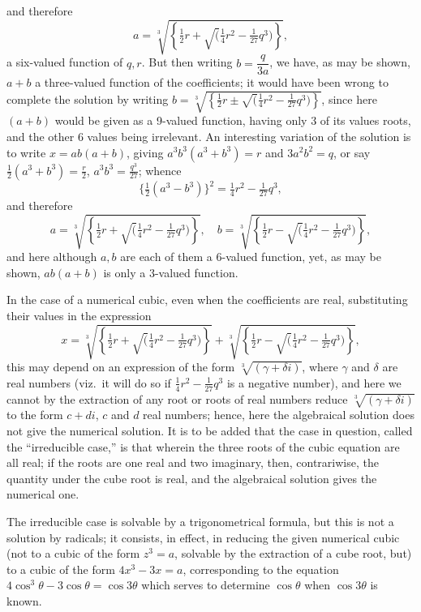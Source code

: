 \documentclass[12pt,a4paper]{article}
\begin{document}
\noindent and therefore
\[
a = \sqrt[3]{\left\{\tfrac{1}{2}r + \surd(\tfrac{1}{4}r^2 - \tfrac{1}{27}q^3)\right\}},
\]
a six-valued function of $q, r$. But then writing $b = \dfrac{q}{3a}$, we have, as may be shown, $a + b$ a three-valued function of the coefficients; it would have been wrong to complete the solution by writing $b = \sqrt[3]{\left\{\tfrac{1}{2}r \pm \surd(\tfrac{1}{4}r^2 - \tfrac{1}{27}q^3)\right\}}$, since here $(a + b)$ would be given as a 9-valued function, having only 3 of its values roots, and the other 6 values being irrelevant. An interesting variation of the solution is to write $x = a b (a + b)$, giving $a^3 b^3 (a^3 + b^3) = r$ and $3 a^2 b^2 = q$, or say $\tfrac{1}{2}(a^3 + b^3) = \tfrac{r}{2}$, $a^3 b^3 = \tfrac{q^3}{27}$; whence
\[
\{\tfrac{1}{2}(a^3 - b^3)\}^2 = \tfrac{1}{4}r^2 - \tfrac{1}{27}q^3,
\]
and therefore
\[
a = \sqrt[3]{\left\{\tfrac{1}{2}r + \surd(\tfrac{1}{4}r^2 - \tfrac{1}{27}q^3)\right\}}, \quad b = \sqrt[3]{\left\{\tfrac{1}{2}r - \surd(\tfrac{1}{4}r^2 - \tfrac{1}{27}q^3)\right\}},
\]
and here although $a, b$ are each of them a 6-valued function, yet, as may be shown, $a b (a + b)$ is only a 3-valued function.

In the case of a numerical cubic, even when the coefficients are real, substituting their values in the expression
\[
x = \sqrt[3]{\left\{\tfrac{1}{2}r + \surd(\tfrac{1}{4}r^2 - \tfrac{1}{27}q^3)\right\}} + \sqrt[3]{\left\{\tfrac{1}{2}r - \surd(\tfrac{1}{4}r^2 - \tfrac{1}{27}q^3)\right\}},
\]
this may depend on an expression of the form $\sqrt[3]{(\gamma + \delta i)}$, where $\gamma$ and $\delta$ are real numbers (viz.\ it will do so if $\tfrac{1}{4}r^2 - \tfrac{1}{27}q^3$ is a negative number), and here we cannot by the extraction of any root or roots of real numbers reduce $\sqrt[3]{(\gamma + \delta i)}$ to the form $c + d i$, $c$ and $d$ real numbers; hence, here the algebraical solution does not give the numerical solution. It is to be added that the case in question, called the ``irreducible case,'' is that wherein the three roots of the cubic equation are all real; if the roots are one real and two imaginary, then, contrariwise, the quantity under the cube root is real, and the algebraical solution gives the numerical one.

The irreducible case is solvable by a trigonometrical formula, but this is not a solution by radicals; it consists, in effect, in reducing the given numerical cubic (not to a cubic of the form $z^3 = a$, solvable by the extraction of a cube root, but) to a cubic of the form $4 x^3 - 3 x = a$, corresponding to the equation $4\cos^3\theta - 3\cos\theta = \cos 3\theta$ which serves to determine $\cos\theta$ when $\cos 3\theta$ is known.
\end{document}
